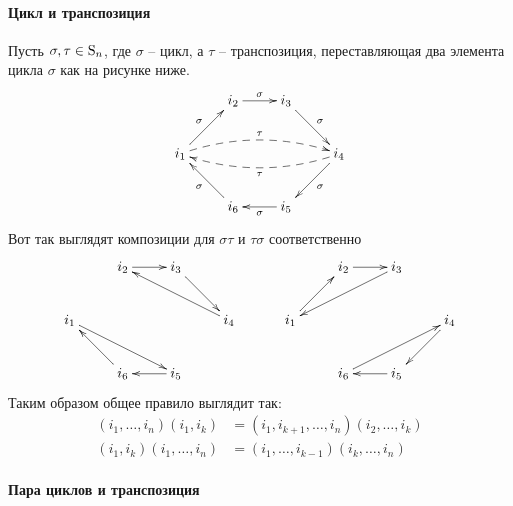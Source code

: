 \paragraph{Цикл и транспозиция}

Пусть $\sigma,\tau\in\operatorname{S}_{n}$, где $\sigma$ -- цикл, а $\tau$ -- транспозиция, переставляющая два элемента цикла $\sigma$ как на рисунке ниже.
\[
\xymatrix{
	{}&{i_2}\ar[r]^{\sigma}&{i_3}\ar[rd]^{\sigma}&{}\\
	{i_1}\ar[ur]^{\sigma}\ar@{-->}@/^10pt/[rrr]^{\tau}&{}&{}&{i_4}\ar[dl]^{\sigma}\ar@{-->}@/^10pt/[lll]^{\tau}\\
	{}&{i_6}\ar[ul]^{\sigma}&{i_5}\ar[l]^{\sigma}&{}\\
}
\]
Вот так выглядят композиции для $\sigma\tau$ и $\tau\sigma$ соответственно
\[
\xymatrix{
	{}&{i_2}\ar[r]&{i_3}\ar[dr]&{}\\
	{i_1}\ar[drr]&{}&{}&{i_4}\ar[ull]\\
	{}&{i_6}\ar[ul]&{i_5}\ar[l]&{}\\
}
\quad\quad\quad
\xymatrix{
	{}&{i_2}\ar[r]&{i_3}\ar[dll]&{}\\
	{i_1}\ar[ur]&{}&{}&{i_4}\ar[dl]\\
	{}&{i_6}\ar[urr]&{i_5}\ar[l]&{}\\
}
\]
Таким образом общее правило выглядит так:
\begin{align*}
(i_1,\ldots,i_n)(i_1,i_k) &= (i_1,i_{k+1},\ldots,i_n)(i_2,\ldots,i_k)\\
(i_1,i_k)(i_1,\ldots,i_n) &= (i_1,\ldots,i_{k-1})(i_k,\ldots,i_n)
\end{align*}

\paragraph{Пара циклов и транспозиция}

